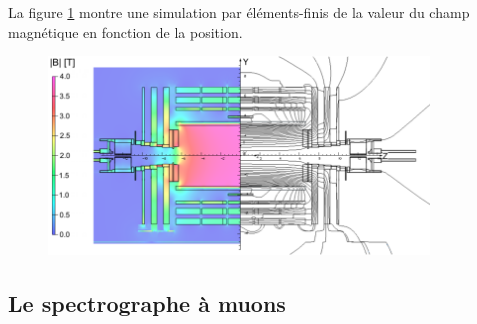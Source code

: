 \newpage
La figure \ref{CHAMP} montre une simulation par éléments-finis de la valeur du champ magnétique en fonction de la position.
\begin{figure}[ht!]
	\centering
	\includegraphics[width=0.90\textwidth]{CMS/CHAMP.png}
	\label{CHAMP}
\end{figure}
\subsection{Le spectrographe à muons}

